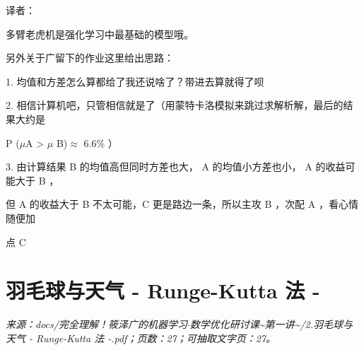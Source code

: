 译者：\par
多臂老虎机是强化学习中最基础的模型哦。\par
另外关于广留下的作业这里给出思路：\par
1. 均值和方差怎么算都给了我还说啥了？带进去算就得了呗\par
2. 相信计算机吧，只管相信就是了（用蒙特卡洛模拟来跳过求解析解，最后的结果大约是\par
P ($\mu$A > $\mu$ B)$\approx$ 6.6\% ）\par
3. 由计算结果 B 的均值高但同时方差也大， A 的均值小方差也小， A 的收益可能大于 B ，\par
但 A 的收益大于 B 不太可能，C 更是路边一条，所以主攻 B ，次配 A ，看心情随便加\par
点 C\par
\endgroup
\clearpage
\section*{羽毛球与天气 - Runge-Kutta 法 -}
\begingroup\small
\noindent\textit{来源：docs/完全理解！筱泽广的机器学习$\cdot$数学优化研讨课\textasciitilde{}第一讲\textasciitilde{}/2.羽毛球与天气 - Runge-Kutta 法 -.pdf；页数：27；可抽取文字页：27。}\par
\endgroup
\medskip
\begingroup
\setlength{\parindent}{0pt}
\setlength{\parskip}{0.45em}

